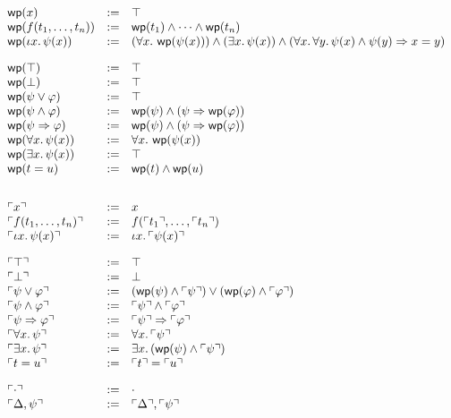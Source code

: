 \documentclass[10pt,a4paper]{article}
\begin{document}
\[
\begin{array}{lll}
  \mathop{\mathsf{wp}}(x) & := & \top\\
  \mathop{\mathsf{wp}}(f({t}_1,\ldots,{t}_{n})) & := & \mathop{\mathsf{wp}}(t_1) \wedge \cdots \wedge \mathop{\mathsf{wp}}(t_n)\\
  \mathop{\mathsf{wp}}(\iota x.\, \psi(x)) & := &
       (\forall x.\, \mathop{\mathsf{wp}}(\psi(x))) \wedge
       (\exists x.\, \psi(x)) \wedge
       (\forall x.\, \forall y.\, \psi(x) \wedge \psi(y) \Rightarrow x=y)\\[10pt]

  \mathop{\mathsf{wp}}(\top) & := & \top\\
  \mathop{\mathsf{wp}}(\bot) & := & \top\\
  \mathop{\mathsf{wp}}(\psi \vee \varphi) & := & \top\\
  \mathop{\mathsf{wp}}(\psi \wedge \varphi) & := & \mathop{\mathsf{wp}}(\psi) \wedge (\psi \Rightarrow \mathop{\mathsf{wp}}(\varphi))\\
  \mathop{\mathsf{wp}}(\psi \Rightarrow \varphi) & := & \mathop{\mathsf{wp}}(\psi) \wedge (\psi \Rightarrow \mathop{\mathsf{wp}}(\varphi))\\
  \mathop{\mathsf{wp}}(\forall x.\, \psi(x)) & := & \forall x.\, \mathop{\mathsf{wp}}(\psi(x))\\
  \mathop{\mathsf{wp}}(\exists x.\, \psi(x)) & := & \top\\
  \mathop{\mathsf{wp}}(t = u) & := & \mathop{\mathsf{wp}}(t) \wedge \mathop{\mathsf{wp}}(u)\\[20pt]
  
  \ulcorner x \urcorner & := & x\\
  \ulcorner f({t}_1,\ldots,{t}_{n}) \urcorner & := & f(\ulcorner t_1 \urcorner,\ldots,\ulcorner t_n \urcorner)\\
  \ulcorner \iota x.\, \psi(x) \urcorner & := & \iota x.\, \ulcorner \psi(x) \urcorner\\[10pt]
  
  \ulcorner \top \urcorner & := & \top\\
  \ulcorner \bot \urcorner & := & \bot\\
  \ulcorner \psi \vee \varphi \urcorner & := & (\mathop{\mathsf{wp}}(\psi) \wedge \ulcorner \psi \urcorner) \vee (\mathop{\mathsf{wp}}(\varphi) \wedge \ulcorner \varphi \urcorner)\\
  \ulcorner \psi \wedge \varphi \urcorner & := & \ulcorner \psi \urcorner \wedge \ulcorner \varphi \urcorner\\
  \ulcorner \psi \Rightarrow \varphi \urcorner & := & \ulcorner \psi \urcorner \Rightarrow \ulcorner \varphi \urcorner\\
  \ulcorner \forall x.\, \psi \urcorner & := & \forall x.\, \ulcorner \psi \urcorner \\
  \ulcorner \exists x.\, \psi \urcorner & := & \exists x.\, (\mathop{\mathsf{wp}}(\psi) \wedge \ulcorner \psi \urcorner)\\
  \ulcorner t = u \urcorner & := & \ulcorner t \urcorner = \ulcorner u \urcorner\\[10pt]
  
  \ulcorner \cdot \urcorner & := & \cdot\\
  \ulcorner \Delta,\psi \urcorner & := & \ulcorner \Delta \urcorner,\ulcorner \psi \urcorner\\
\end{array}
\]
\end{document}
